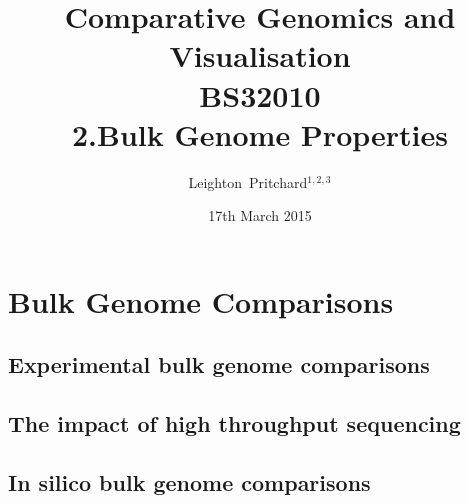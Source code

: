 

%



\title[Comparative Genomics and Visualisation: 2.Bulk Properties] %
{Comparative Genomics and \\ Visualisation \\
BS32010 \\
2.Bulk Genome Properties}
\author[Pritchard] %
{Leighton~Pritchard$^{1,2,3}$}
\date[17th March 2015] %
{17th March 2015}
\subject{Bioinformatics, Genomics, Bacteria, Sequencing, Microbiology, Microbes, Comparative Genomics, Visualisation}





\frame[plain]{\titlepage}



\section{Bulk Genome Comparisons}
\subsection{Experimental bulk genome comparisons}

\subsection{The impact of high throughput sequencing}

\subsection{In silico bulk genome comparisons}





